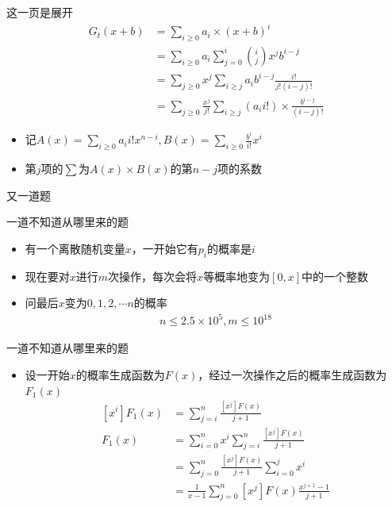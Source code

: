 \documentclass{beamer}
\begin{document}
\begin{frame}{这一页是展开}
    $$\begin{aligned}
        G_t(x + b) &= \sum_{i\geq 0}a_i\times (x + b)^i\\
        &= \sum_{i\geq 0}a_i\sum_{j = 0}^i{i\choose j}x^jb^{i-j}\\
        &= \sum_{j\geq 0}x^j\sum_{i\geq j}a_ib^{i-j}\frac{i!}{j!(i-j)!}\\
        &= \sum_{j\geq 0}\frac{x^j}{j!}\sum_{i\geq j}(a_ii!)\times \frac{b^{i - j}}{(i - j)!}
    \end{aligned}$$ \pause
    \begin{itemize}
        \item 记$A(x) = \sum_{i\geq 0}a_{i}i!x^{n-i},B(x)=\sum_{i\geq 0}\frac{b^i}{i!}x^i$
        \item 第$j$项的$\sum$为$A(x)\times B(x)$的第$n-j$项的系数
    \end{itemize}
\end{frame}

\begin{frame}{又一道题}
    \begin{block}{一道不知道从哪里来的题}
        \begin{itemize}
            \item 有一个离散随机变量$x$，一开始它有$p_i$的概率是$i$
            \item 现在要对$x$进行$m$次操作，每次会将$x$等概率地变为$[0,x]$中的一个整数
            \item 问最后$x$变为$0,1,2,\cdots n$的概率
            $$\begin{aligned}
                n\leq 2.5\times 10^5,m\leq 10^{18}
            \end{aligned}$$
        \end{itemize}
    \end{block}
\end{frame}

\begin{frame}{一道不知道从哪里来的题}
    \begin{itemize}
        \item 设一开始$x$的概率生成函数为$F(x)$，经过一次操作之后的概率生成函数为$F_1(x)$ \pause
        $$\begin{aligned}
            {[x^i] }F_1(x) &= \sum_{j = i}^n \frac{[x^j]F(x)}{j + 1}\\
            F_1(x) &= \sum_{i = 0}^nx^i\sum_{j = i}^n\frac{[x^j]F(x)}{j + 1}\\
            &= \sum_{j = 0}^n\frac{[x^j]F(x)}{j + 1}\sum_{i = 0}^j x^i\\
            &= \frac{1}{x - 1}\sum_{j = 0}^n[x^j]F(x)\frac{x^{j + 1} - 1}{j + 1}
        \end{aligned}$$
    \end{itemize}
\end{frame}
\end{document}
